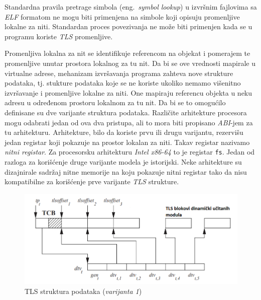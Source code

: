 \documentclass[12pt,oneside]{memoir}
\begin{document}
Standardna pravila pretrage simbola (eng.~\emph{symbol lookup}) u izvršnim fajlovima sa \emph{ELF} formatom ne mogu biti primenjena na simbole koji opisuju promenljive lokalne za niti. Standardan proces povezivanja ne može biti primenjen kada se u programu koriste \emph{TLS} promenljive.

Promenljiva lokalna za nit se identifikuje referencom na objekat i pomerajem te promenljive unutar prostora lokalnog za tu nit. Da bi se ove vrednosti mapirale u virtualne adrese, mehanizam izvršavanja programa zahteva nove strukture podataka, tj. stukture podataka koje se ne koriste ukoliko nemamo višenitno izvršavanje i promenljive lokalne za niti. One mapiraju referencu objekta u neku adresu u određenom prostoru lokalnom za tu nit. Da bi se to omogućilo definisane su dve varijante struktura podataka. Različite arhitekture procesora mogu odabrati jedan od ova dva pristupa, ali to mora biti propisano \emph{ABI}-jem za tu arhitekturu. Arhitekture, bilo da koriste prvu ili drugu varijantu, rezervišu jedan registar koji pokazuje na prostor lokalan za niti. Takav registar nazivamo \emph{nitni registar}. Za procesorsku arhitekturu \emph{Intel x86-64} to je registar \texttt{fs}. Jedan od razloga za korišćenje druge varijante modela je istorijski. Neke arhitekture su dizajnirale sadržaj nitne memorije na koju pokazuje nitni registar tako da nisu kompatibilne za korišćenje prve varijante \emph{TLS} strukture.

\begin{figure}[h!]
	\begin{center}
		\includegraphics[scale=0.6]{slike/TLSModelV1.png}
	\end{center}
	\caption{TLS struktura podataka (\emph{varijanta 1})}
	\label{fig:tls_model1}
\end{figure}
\end{document}
